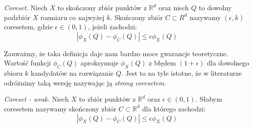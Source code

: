 \begin{definition}
    \emph{Coreset.} Niech $X$ to skończony zbiór punktów z $\mathbb{R}^{d}$ oraz niech $Q$ to dowolny podzbiór $X$ rozmiaru co najwyżej $k$. 
    Skończony zbiór $C \subset R^{d}$ nazywamy $(\epsilon, k)$ coresetem, gdzie $\epsilon \in (0, 1)$, jeżeli zachodzi:
    \begin{equation}
        |\phi_{X}(Q) - \phi_{C}(Q)| \leq \epsilon\phi_{X}(Q)
    \end{equation}
\end{definition}

\noindent
Zauważmy, że taka definicja daje nam bardzo moce gwarancje teoretyczne.
Wartość funkcji $\phi_{C}(Q)$ aproksymuje $\phi_{X}(Q)$ z błędem $(1+\epsilon)$ dla dowolnego zbioru $k$ kandydatów na rozwiązanie $Q$.
Jest to na tyle istotne, że w literaturze odróżnimy taką wersję nazywając ją \textit{strong coresetem}.

\begin{definition}
    \emph{Coreset - weak.} Niech $X$ to zbiór punktów z $\mathbb{R}^{d}$ oraz $\epsilon \in (0, 1)$.
    Słabym coresetem nazywamy skończony zbiór $C \subset \mathbb{R}^d$ dla którego zachodzi:
    \begin{equation}
        |\phi_{X}(Q) - \phi_{C}(Q)| \leq \epsilon\phi_{X}(Q)
    \end{equation}
\end{definition}


